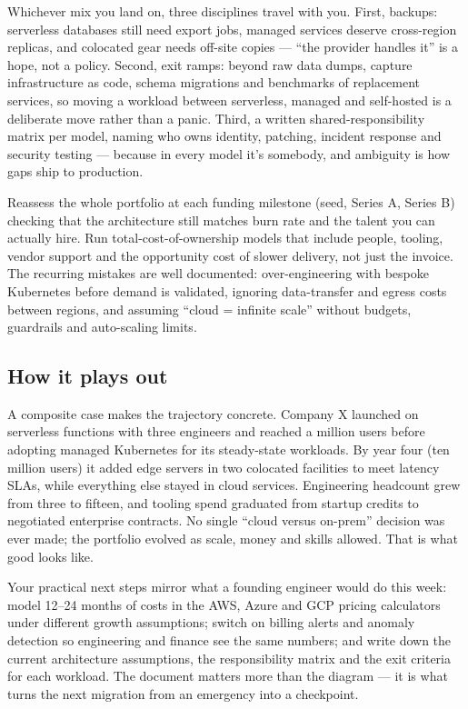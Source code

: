 Whichever mix you land on, three disciplines travel with you. First, backups: serverless databases still need export jobs, managed services deserve cross-region replicas, and colocated gear needs off-site copies — ``the provider handles it'' is a hope, not a policy. Second, exit ramps: beyond raw data dumps, capture infrastructure as code, schema migrations and benchmarks of replacement services, so moving a workload between serverless, managed and self-hosted is a deliberate move rather than a panic. Third, a written shared-responsibility matrix per model, naming who owns identity, patching, incident response and security testing — because in every model it's somebody, and ambiguity is how gaps ship to production.


Reassess the whole portfolio at each funding milestone (seed, Series A, Series B) checking that the architecture still matches burn rate and the talent you can actually hire. Run total-cost-of-ownership models that include people, tooling, vendor support and the opportunity cost of slower delivery, not just the invoice. The recurring mistakes are well documented: over-engineering with bespoke Kubernetes before demand is validated, ignoring data-transfer and egress costs between regions, and assuming ``cloud = infinite scale'' without budgets, guardrails and auto-scaling limits.



\subsection{How it plays out}


A composite case makes the trajectory concrete. Company X launched on serverless functions with three engineers and reached a million users before adopting managed Kubernetes for its steady-state workloads. By year four (ten million users) it added edge servers in two colocated facilities to meet latency SLAs, while everything else stayed in cloud services. Engineering headcount grew from three to fifteen, and tooling spend graduated from startup credits to negotiated enterprise contracts. No single ``cloud versus on-prem'' decision was ever made; the portfolio evolved as scale, money and skills allowed. That is what good looks like.


Your practical next steps mirror what a founding engineer would do this week: model 12–24 months of costs in the AWS, Azure and GCP pricing calculators under different growth assumptions; switch on billing alerts and anomaly detection so engineering and finance see the same numbers; and write down the current architecture assumptions, the responsibility matrix and the exit criteria for each workload. The document matters more than the diagram — it is what turns the next migration from an emergency into a checkpoint.


